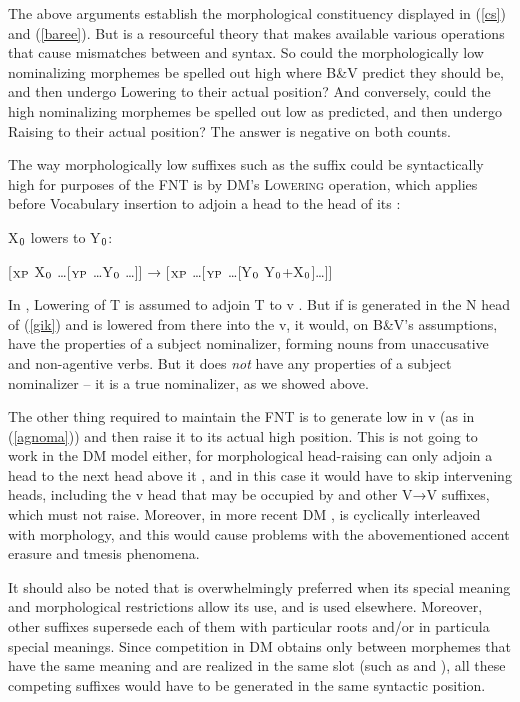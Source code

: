 \documentclass[output=paper,
modfonts
]{LSP/langsci}
\newcommand{\rf}[1]{(\ref{#1})}
\def\trf#1{$_{\textrm{\scriptsize{#1}}}$}
\def\urf#1{$^{\textrm{\scriptsize{#1}}}$}
\begin{document}
The above arguments establish the morphological constituency displayed in \rf{cs} and
\rf{baree}.  But  is a resourceful theory that makes available various
 operations that cause mismatches between  and syntax. So could the
morphologically low nominalizing morphemes be spelled out high where B\&V predict they should
be, and then undergo Lowering to their actual position?  And conversely, could the high
nominalizing morphemes be spelled out low as predicted, and then undergo Raising to their
actual position?  The answer is negative on both counts.

   The way morphologically low suffixes such as the  suffix \form{′-tar-\urf{V}} could
   be syntactically high for purposes of the FNT is by DM's \textsc{Lowering} operation, which
   applies before Vocabulary insertion to adjoin a head to the head of its  \citep{embick2001}: \begin{exe}
\ex

X\trf{0} lowers  to Y\trf{0}:

[\trf{XP} X\trf{0} …[\trf{YP} …Y\trf{0} …]] → [\trf{XP} …[\trf{YP} …[Y\trf{0} Y\trf{0}+X\trf{0}]…]]
\end{exe}
In , Lowering of T is assumed to adjoin T to v \citep{embick2008}.
But if \form{′-{tar-}\urf{V}} is generated in the N head of \rf{gik} and is lowered from
there into the v, it would, on B\&V's assumptions, have the properties of a subject
nominalizer, forming nouns from unaccusative and non-agentive verbs.  But it does \textit{not}
have any properties of a subject nominalizer – it is a true  nominalizer, as we showed
above.

The other thing required to maintain the FNT is to generate \form{-{tár-}\urf{N}} low in v
(as in \rf{agnoma}) and then raise it to its actual high position.  This is not going to work
in the DM model either, for morphological head-raising can only adjoin a head to the next head
above it \citep{harizanov2016}, and in this case it would have to skip intervening heads,
including the v head that may be occupied by  and other V→V suffixes, which must not
raise.  Moreover, in more recent DM \citep{embick2010},  is cyclically interleaved with
morphology, and this would cause problems with the abovementioned accent erasure and tmesis
phenomena.

It should also be noted that \form{′-{tar-}\urf{V}} is overwhelmingly preferred when its
special meaning and morphological restrictions allow its use, and \form{-{tár-}\urf{N}} is
used elsewhere. Moreover, other  suffixes supersede each of them with particular roots
and/or in particula special meanings. Since competition in DM obtains only between morphemes
that have the same meaning and are realized in the same slot (such as  
 and ), all these competing suffixes would have to be generated in the
same syntactic position.
\end{document}
